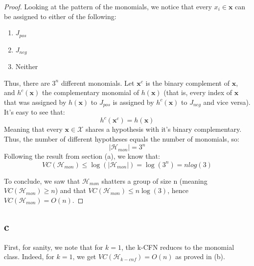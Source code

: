 \begin{proof}
    Looking at the pattern of the monomials, we notice that every $x_i \in \boldsymbol{x}$ can be assigned to either of the following:
    \begin{enumerate}
        \item $J_{pos}$
        \item $J_{neg}$
        \item Neither
    \end{enumerate}
    Thus, there are $3^n$ different monomials. 
    Let $\boldsymbol{x}^c$ is the binary complement of $\boldsymbol{x}$, and $h^c(\boldsymbol{x})$ the complementary monomial of $h(\boldsymbol{x})$ (that is, every index of $\boldsymbol{x}$ that was assigned by $h(\boldsymbol{x})$ to $J_{pos}$ is assigned by $h^c(\boldsymbol{x})$ to $J_{neg}$ and vice versa).
    It's easy to see that:
    \begin{equation*}
        h^c(\boldsymbol{x}^c) = h(\boldsymbol{x})
    \end{equation*}
    Meaning that every $\boldsymbol{x} \in \mathcal{X}$ shares a hypothesis with it's binary complementary. Thus, the number of different hypotheses equals the number of monomials, so:
    \begin{equation*}
        |\mathcal{H}_{mon}| = 3^n
    \end{equation*}
    Following the result from section (a), we know that:
    \begin{equation*}
        VC(\mathcal{H}_{mon}) \leq \log(|\mathcal{H}_{mon}|) = \log(3^n) = n log(3)
    \end{equation*}
    
    To conclude, we saw that $\mathcal{H}_{mon}$ shatters a group of size n (meaning $VC(\mathcal{H}_{mon}) \geq n$) and that $VC(\mathcal{H}_{mon}) \leq n\log(3)$, hence $VC(\mathcal{H}_{mon}) = O(n)$.
\end{proof}

\subsection*{c}
First, for sanity, we note that for $k=1$, the k-CFN reduces to the monomial class. 
Indeed, for $k=1$, we get $VC(\mathcal{H}_{k-cnf}) = O(n)$ as proved in (b).
